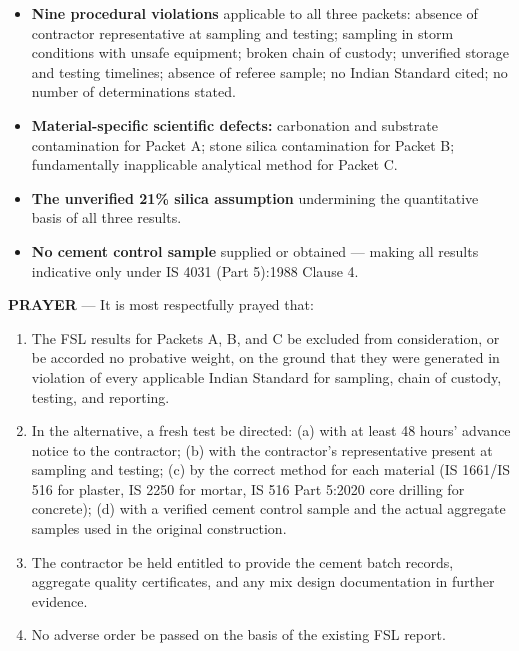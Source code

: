 \documentclass[12pt, a4paper]{article}
\begin{document}
\begin{itemize}
  \item \textbf{Nine procedural violations} applicable to all three packets: absence of contractor representative at sampling and testing; sampling in storm conditions with unsafe equipment; broken chain of custody; unverified storage and testing timelines; absence of referee sample; no Indian Standard cited; no number of determinations stated.
  \item \textbf{Material-specific scientific defects:} carbonation and substrate contamination for Packet A; stone silica contamination for Packet B; fundamentally inapplicable analytical method for Packet C.
  \item \textbf{The unverified 21\% silica assumption} undermining the quantitative basis of all three results.
  \item \textbf{No cement control sample} supplied or obtained --- making all results indicative only under IS 4031 (Part 5):1988 Clause 4.
\end{itemize}

\begin{prayerbox}
\textbf{PRAYER} --- It is most respectfully prayed that:
\begin{enumerate}
  \item The FSL results for Packets A, B, and C be excluded from consideration, or be accorded no probative weight, on the ground that they were generated in violation of every applicable Indian Standard for sampling, chain of custody, testing, and reporting.
  \item In the alternative, a fresh test be directed: (a) with at least 48 hours' advance notice to the contractor; (b) with the contractor's representative present at sampling and testing; (c) by the correct method for each material (IS 1661/IS 516 for plaster, IS 2250 for mortar, IS 516 Part 5:2020 core drilling for concrete); (d) with a verified cement control sample and the actual aggregate samples used in the original construction.
  \item The contractor be held entitled to provide the cement batch records, aggregate quality certificates, and any mix design documentation in further evidence.
  \item No adverse order be passed on the basis of the existing FSL report.
\end{enumerate}
\end{prayerbox}

\end{document}
